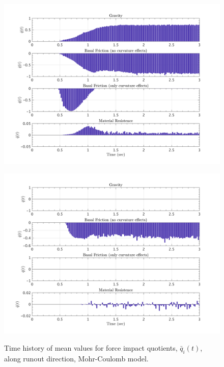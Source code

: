 \documentclass{article}
\begin{document}
\begin{figure}[H]
        \begin{minipage}[b]{0.5\linewidth}
                \centering
                \includegraphics[width=1\textwidth]{InclinedPlane/LocalRecords/ContribF15_C_x.png}
                \label{fig:Ramp-Cx3}
        \end{minipage}
        \begin{minipage}[b]{0.5\linewidth}
                \centering
                \includegraphics[width=1\textwidth]{InclinedPlane/LocalRecords/ContribF17_C_x.png}
                \label{fig:Ramp-Cx4}
        \end{minipage}
        \caption{Time history of mean values for force impact quotients, $\bar{q}_i(t)$, along runout direction, Mohr-Coulomb model.}
        \label{fig:Ramp-Cx}
\end{figure}
\end{document}
